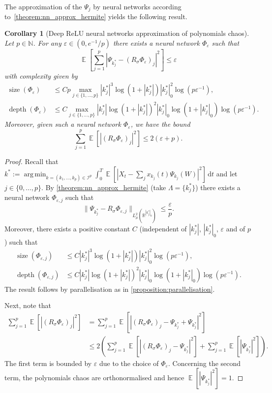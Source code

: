 \documentclass[12pt]{article}
\newtheorem{corollary}[theorem]{Corollary}
\theoremstyle{remark}
\theoremstyle{plain}
\numberwithin{equation}{section}
\DeclareMathOperator*{\argmin}{arg\,min}
\newcommand{\dd}{\ensuremath{\,\mathrm d}}
\DeclareMathOperator{\E}{\mathbb E}
\newcommand{\N}{\mathbb{N}}
\newcommand{\R}{\mathbb{R}}
\DeclareMathOperator{\Size}{size}
\DeclareMathOperator{\Depth}{depth}
\begin{document}
The approximation of the $\Psi_j$ by neural networks according to~\cref{theorem:nn_approx_hermite} yields the following result.
\begin{corollary}[{Deep ReLU neural networks approximation of polynomials chaos}]\label{corollary:relu_approx_chaos}
    Let $p \in \N$. For any $\varepsilon \in (0,e^{-1}/p)$ there exists a neural network $\Phi_\varepsilon$ such that
    \begin{equation*}
        \E\left[\sum_{j=1}^p |\Psi_{k_j^*} - (R_\sigma\Phi_\varepsilon)_j|^2 \right] \leq \varepsilon
    \end{equation*}
    with complexity given by
    \begin{align*}
        \Size(\Phi_\varepsilon) &\leq Cp \max_{j \in \{1,\dots,p\}}|k_j^*|^3 \log(1+|k_j^*|)|k_j^*|_0^2 \log(p\varepsilon^{-1}),\\
        \Depth(\Phi_\varepsilon) &\leq C\max_{j \in \{1,\dots,p\}} |k_j^*|\log(1+|k_j^*|)^2|k_j^*|_0\log(1+|k_j^*|_0)\log(p\varepsilon^{-1}).
    \end{align*}
    Moreover, given such a neural network $\Phi_\varepsilon$, we have the bound
    \begin{equation*}
        \sum_{j=1}^p \E[|(R_\sigma\Phi_\varepsilon)_j|^2] \leq 2(\varepsilon + p).
    \end{equation*}
\end{corollary}
\begin{proof}
    Recall that $k^* := \argmin_{k = (k_1,\dots,k_p) \in \mathcal I^p} \int_0^T \E[|X_t - \sum_j x_{k_j}(t) \Psi_{k_j}(W)|^2]\dd t$ and let $j \in \{0, \dots, p\}$.
    By \cref{theorem:nn_approx_hermite} (take $\Lambda = \{k_j^*\}$) there exists a neural network $\Phi_{\varepsilon,j}$ such that
    \begin{equation*}
        \|\Psi_{k_j^*} - R_\sigma\Phi_{\varepsilon,j}\|_{L_\mu^2(\R^{|k_j^*|_0})} \leq \frac \varepsilon p.
    \end{equation*}
    Moreover, there exists a positive constant $C$ (independent of $|k_j^*|$, $|k_j^*|_0$, $\varepsilon$ and of $p$) such that
    \begin{align*}
        \Size(\Phi_{\varepsilon,j}) &\leq C |k_j^*|^3 \log(1+|k_j^*|)|k_j^*|_0^2 \log(p\varepsilon^{-1}),\\
        \Depth(\Phi_{\varepsilon,j}) &\leq C|k_j^*|\log(1+|k_j^*|)^2|k_j^*|_0\log(1+|k_j^*|_0)\log(p\varepsilon^{-1}).
    \end{align*}
    The result follows by parallelisation as in \cref{proposition:parallelisation}.

    Next, note that
    \begin{align*}
        \sum_{j=1}^p \E[|(R_\sigma\Phi_\varepsilon)_j|^2] &= \sum_{j=1}^p \E[|(R_\sigma\Phi_\varepsilon)_j - \Psi_{k_j^*} + \Psi_{k_j^*}|^2]\\
        &\leq 2\left(\sum_{j=1}^p \E[|(R_\sigma\Phi_\varepsilon)_j - \Psi_{k_j^*}|^2] + \sum_{j=1}^p \E[|\Psi_{k_j^*}|^2]\right).
    \end{align*}
    The first term is bounded by $\varepsilon$ due to the choice of $\Phi_\varepsilon$. Concerning the second term, the polynomials chaos are orthonormalised and hence $\E[|\Psi_{k_j^*}|^2] = 1$.
\end{proof}
\end{document}
